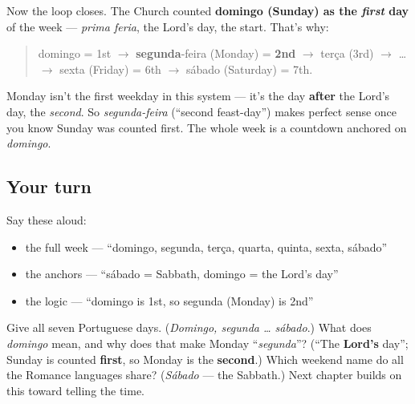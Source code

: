 \begin{grammarlens}[title={Grammar Lens: domingo is \textquotedblleft{}day one\textquotedblright{} — so Monday is \textquotedblleft{}day two\textquotedblright{}}]
Now the loop closes. The Church counted \textbf{domingo (Sunday) as the \emph{first} day} of the week — \emph{prima feria}, the Lord's day, the start. That's why:

\begin{quote}
domingo = 1st $\to$ \textbf{segunda}-feira (Monday) = \textbf{2nd} $\to$ terça (3rd) $\to$ … $\to$ sexta (Friday) = 6th $\to$ sábado (Saturday) = 7th.
\end{quote}

Monday isn't the first weekday in this system — it's the day \textbf{after} the Lord's day, the \emph{second}. So \emph{segunda-feira} (\textquotedblleft{}second feast-day\textquotedblright{}) makes perfect sense once you know Sunday was counted first. The whole week is a countdown anchored on \emph{domingo}.
\end{grammarlens}

\subsection*{Your turn}
Say these aloud:

\begin{itemize}
\raggedright
  \item the full week — \textquotedblleft{}domingo, segunda, terça, quarta, quinta, sexta, sábado\textquotedblright{}
  \item the anchors — \textquotedblleft{}sábado = Sabbath, domingo = the Lord's day\textquotedblright{}
  \item the logic — \textquotedblleft{}domingo is 1st, so segunda (Monday) is 2nd\textquotedblright{}
\end{itemize}

\begin{tcolorbox}[breakable,colback=teal!4,colframe=teal!35!black,title={Before you move on}]
Give all seven Portuguese days. (\emph{Domingo, segunda … sábado}.) What does \emph{domingo} mean, and why does that make Monday \textquotedblleft{}\emph{segunda}\textquotedblright{}? (\textquotedblleft{}The \textbf{Lord's} day\textquotedblright{}; Sunday is counted \textbf{first}, so Monday is the \textbf{second}.) Which weekend name do all the Romance languages share? (\emph{Sábado} — the Sabbath.) Next chapter builds on this toward telling the time.
\end{tcolorbox}
